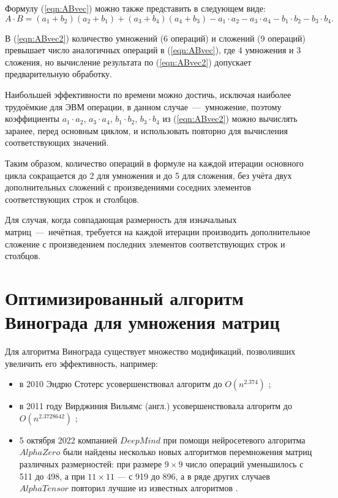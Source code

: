 Формулу (\ref{eqn:ABvec}) можно также представить в следующем виде:
\begin{equation} \label{eqn:ABvec2}
	A \cdot B = (a_1 + b_2)(a_2 + b_1) + (a_3 + b_4)(a_4 + b_3) - a_1 \cdot a_2 - a_3 \cdot a_4 - b_1 \cdot b_2 - b_3 \cdot b_4.
\end{equation}

В (\ref{eqn:ABvec2}) количество умножений (6 операций) и сложений (9 операций) превышает число аналогичных операций в (\ref{eqn:ABvec}), где 4 умножения и 3 сложения, но вычисление результата по (\ref{eqn:ABvec2}) допускает предварительную обработку.

Наибольшей эффективности по времени можно достичь, исключая наиболее трудоёмкие для ЭВМ операции, в данном случае~---~умножение, поэтому коэффициенты $a_1 \cdot a_2$, $a_3 \cdot a_4$, $b_1 \cdot b_2$, $b_3 \cdot b_4$ из (\ref{eqn:ABvec2}) можно вычислять заранее, перед основным циклом, и использовать повторно для вычисления соответствующих значений.

Таким образом, количество операций в формуле на каждой итерации основного цикла сокращается до 2 для умножения и до 5 для сложения, без учёта двух дополнительных сложений с произведениями соседних элементов соответствующих строк и столбцов.

Для случая, когда совпадающая размерность для изначальных матриц~---~нечётная, требуется на каждой итерации производить дополнительное сложение с произведением последних элементов соответствующих строк и столбцов.

\section{Оптимизированный алгоритм Винограда для умножения матриц} \label{better}
Для алгоритма Винограда существует множество модификаций, позволивших увеличить его эффективность, например:
\begin{itemize}
	\item в 2010 Эндрю Стотерс усовершенствовал алгоритм до $O(n^{2.374})$ \cite{web_item7};
	\item в 2011 году Вирджиния Вильямс (англ.) усовершенствовала алгоритм до $O(n^{2.3728642})$ \cite{web_item8};
	\item 5 октября 2022 компанией $DeepMind$ при помощи нейросетевого алгоритма $AlphaZero$ были найдены несколько новых алгоритмов перемножения матриц различных размерностей: при размере $9\times9$ число операций уменьшилось с 511 до 498, а при $11\times11$ — с 919 до 896, а в ряде других случаев $AlphaTensor$ повторил лучшие из известных алгоритмов \cite{web_item9}.
\end{itemize}


